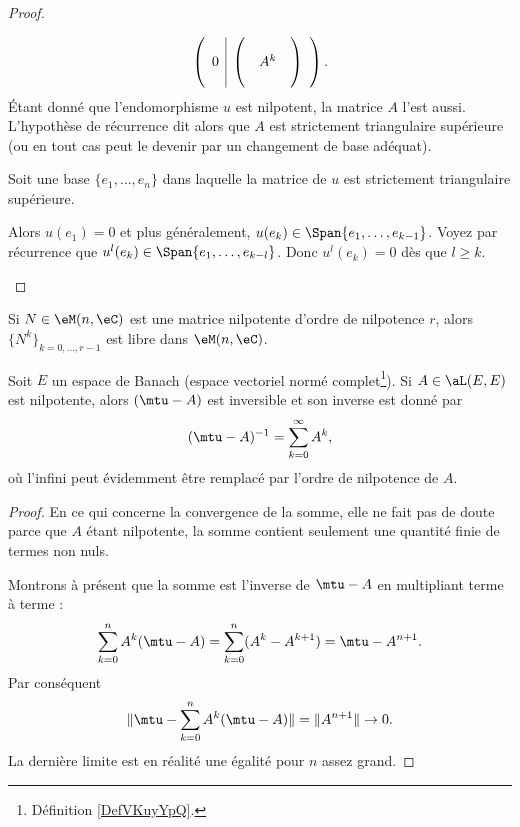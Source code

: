 \begin{proof}
\begin{subproof}
\begin{equation}
\begin{pmatrix}
\begin{array}[]{c|c}
\begin{matrix}
						0
					\end{matrix} &
					\begin{pmatrix}
						 &     & \\
						 & A^k & \\
						 &     &
					\end{pmatrix}
				\end{array}
			\end{pmatrix}.
		\end{equation}
		Étant donné que l'endomorphisme \( u\) est nilpotent, la matrice \( A\) l'est aussi. L'hypothèse de récurrence dit alors que \( A\) est strictement triangulaire supérieure (ou en tout cas peut le devenir par un changement de base adéquat).

		\spitem[\( \Leftarrow\)]
		Soit une base \( \{ e_1,\ldots, e_n \}  \) dans laquelle la matrice de \( u\) est strictement triangulaire supérieure.

		Alors \( u(e_1)=0\) et plus généralement, \( u(e_k)\in \Span\{ e_1,\ldots, e_{k-1} \}\). Voyez par récurrence que \( u^l(e_k)\in \Span\{ e_1,\ldots, e_{k-l} \}\). Donc \( u^l(e_k)=0\) dès que \( l\geq k\).
	\end{subproof}
\end{proof}

\begin{lemma}        \label{LEMooKPWKooOacXju}
	Si \( N\in \eM(n,\eC)\) est une matrice nilpotente d'ordre de nilpotence \( r\), alors \( \{ N^k \}_{k=0,\ldots, r-1}\) est libre dans \( \eM(n,\eC)\).
\end{lemma}

\begin{proposition}     \label{PROPooWTFWooXHlmhp}
	Soit \( E\) un espace de Banach (espace vectoriel normé complet\footnote{Définition \ref{DefVKuyYpQ}.}). Si \( A\in\aL(E,E)\) est nilpotente, alors \( (\mtu-A)\) est inversible et son inverse est donné par
	\begin{equation}
		(\mtu-A)^{-1}=\sum_{k=0}^{\infty}A^k,
	\end{equation}
	où l'infini peut évidemment être remplacé par l'ordre de nilpotence de \( A\).
\end{proposition}

\begin{proof}
	En ce qui concerne la convergence de la somme, elle ne fait pas de doute parce que \( A\) étant nilpotente, la somme contient seulement une quantité finie de termes non nuls.

	Montrons à présent que la somme est l'inverse de \( \mtu-A\) en multipliant terme à terme :
	\begin{equation}
		\sum_{k=0}^nA^k(\mtu-A)=\sum_{k=0}^n(A^k-A^{k+1})=\mtu-A^{n+1}.
	\end{equation}
	Par conséquent
	\begin{equation}
		\| \mtu-\sum_{k=0}^nA^k(\mtu-A) \|=\| A^{n+1} \|\to 0.
	\end{equation}
	La dernière limite est en réalité une égalité pour \( n\) assez grand.
\end{proof}


